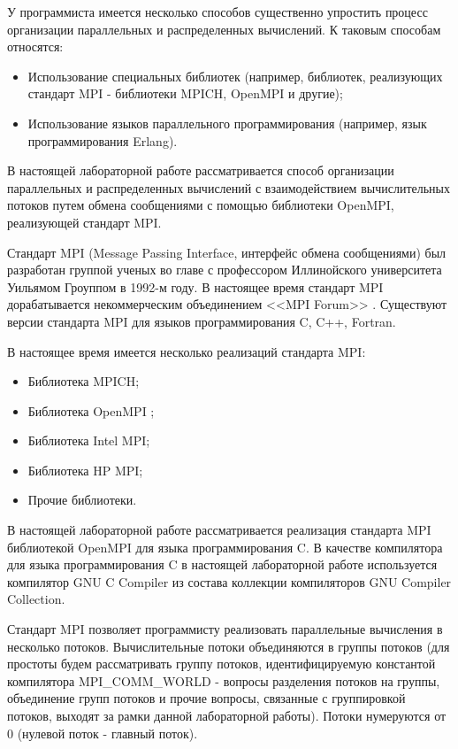 У программиста имеется несколько способов существенно упростить процесс организации параллельных и распределенных вычислений. К таковым способам относятся:

\begin{itemize}

	\item Использование специальных библиотек (например, библиотек, реализующих стандарт MPI - библиотеки MPICH, OpenMPI и другие);
	\item Использование языков параллельного программирования (например, язык программирования Erlang).

\end{itemize}

В настоящей лабораторной работе рассматривается способ организации параллельных и распределенных вычислений с взаимодействием вычислительных потоков путем обмена сообщениями с помощью библиотеки OpenMPI, реализующей стандарт MPI.


Стандарт MPI (Message Passing Interface, интерфейс обмена сообщениями) был разработан группой ученых во главе с профессором Иллинойского университета Уильямом Гроуппом в 1992-м году. В настоящее время стандарт MPI дорабатывается некоммерческим объединением <<MPI Forum>> \cite{mpi-forum}. Существуют версии стандарта MPI для языков программирования C, C++, Fortran.

В настоящее время имеется несколько реализаций стандарта MPI:

\begin{itemize}

	\item Библиотека MPICH;
	\item Библиотека OpenMPI \cite{openmpi};
	\item Библиотека Intel MPI;
	\item Библиотека HP MPI;
	\item Прочие библиотеки.

\end{itemize}

В настоящей лабораторной работе рассматривается реализация стандарта MPI библиотекой OpenMPI для языка программирования C. В качестве компилятора для языка программирования C в настоящей лабораторной работе используется компилятор GNU C Compiler из состава коллекции компиляторов GNU Compiler Collection.

Стандарт MPI позволяет программисту реализовать параллельные вычисления в несколько потоков. Вычислительные потоки объединяются в группы потоков (для простоты будем рассматривать группу потоков, идентифицируемую константой компилятора \linebreak MPI\_COMM\_WORLD - вопросы разделения потоков на группы, объединение групп потоков и прочие вопросы, связанные с группировкой потоков, выходят за рамки данной лабораторной работы). Потоки нумеруются от 0 (нулевой поток - главный поток).

